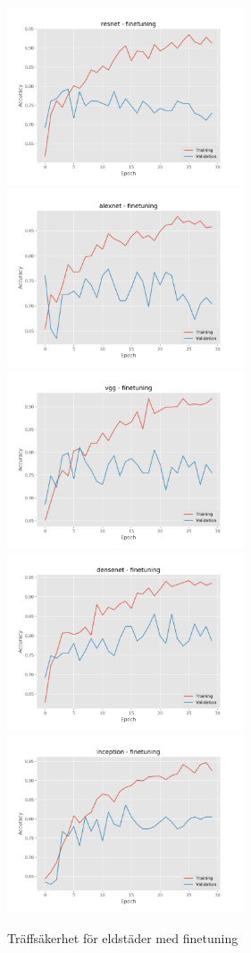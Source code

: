 \documentclass[]{kththesis}
\begin{document}
  \begin{figure}[h]
    \includegraphics[width=7cm]{f_a_resnet_fine}
    \includegraphics[width=7cm]{f_a_alexnet_fine}
    \includegraphics[width=7cm]{f_a_vgg_fine}
    \includegraphics[width=7cm]{f_a_densenet_fine}
    \includegraphics[width=7cm]{f_a_inception_fine}
    \caption{Träffsäkerhet för eldstäder med finetuning}
    \label{fig:f_a_2}
  \end{figure}
  
\end{document}
